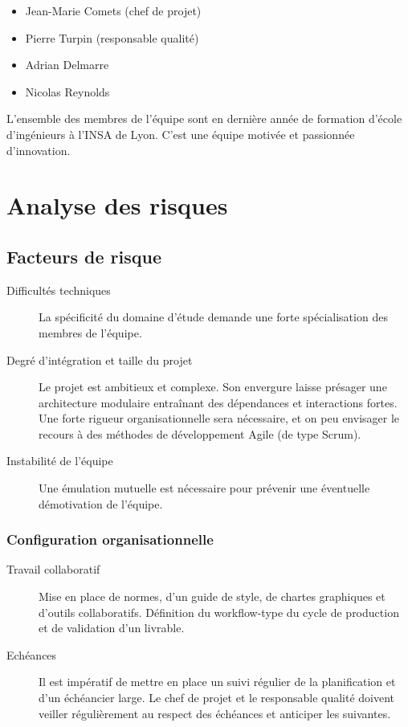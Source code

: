 \begin{itemize}
    \item Jean-Marie Comets (chef de projet)
    \item Pierre Turpin (responsable qualité)
    \item Adrian Delmarre
    \item Nicolas Reynolds
\end{itemize}

L'ensemble des membres de l'équipe sont en dernière année de formation d'école
d'ingénieurs à l'INSA de Lyon. C'est une équipe motivée et passionnée
d'innovation.

\section{Analyse des risques}

\subsection{Facteurs de risque}

\begin{description}
    \item[Difficultés techniques] La spécificité du domaine d'étude demande une
        forte spécialisation des membres de l'équipe.
    \item[Degré d'intégration et taille du projet] Le projet est ambitieux et
        complexe. Son envergure laisse présager une architecture modulaire
        entraînant des dépendances et interactions fortes. Une forte rigueur
        organisationnelle sera nécessaire, et on peu envisager le recours à des
        méthodes de développement Agile (de type Scrum).
    \item[Instabilité de l'équipe] Une émulation mutuelle est nécessaire pour
        prévenir une éventuelle démotivation de l'équipe.
\end{description}

\subsubsection{Configuration organisationnelle}

\begin{description}
    \item[Travail collaboratif] Mise en place de normes, d'un guide de style,
        de chartes graphiques et d'outils collaboratifs.  Définition du
        workflow-type du cycle de production et de validation d'un livrable.
    \item[Echéances] Il est impératif de mettre en place un suivi régulier de
        la planification et d'un échéancier large. Le chef de projet et le
        responsable qualité doivent veiller régulièrement au respect des
        échéances et anticiper les suivantes.
\end{description}

